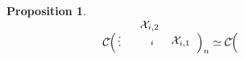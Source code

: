 \documentclass[10pt]{amsart}
\theoremstyle{break}
\newtheorem{pro}[de]{Proposition}
\begin{document}
\begin{pro}
\begin{eqnarray*}
{{\mathcal{C}}}\acute{}\Big( \ 
\unitlength 0.1in
\begin{picture}(9.0,2.500)(2.00,-4.500)
\special{pn 8}\special{pa 370 300}\special{pa 330 250}\special{fp}\special{pa 275 355}\special{pa 200 280}\special{fp}\special{pa 280 450}\special{pa 200 490}\special{fp}\special{pa 370 500}\special{pa 340 550}\special{fp}\put(2.000,-4.5000){\makebox(0,0){$\cdot$}}\put(1.9000,-4.000){\makebox(0,0){$\cdot$}}\put(2.000,-3.5000){\makebox(0,0){$\cdot$}}\put(9.5000,-4.000){\makebox(0,0){$\mathcal{X}_{{i,1}}$}}\put(5.660000,-2.0000){\makebox(0,0){$\mathcal{X}_{{i,2}}$}}\put(6.000,-4.1000){\makebox(0,0){${}_{i}$}}\special{pn 8}\special{ar 370 400 100 100  0.0000000 0.1200000}\special{ar 370 400 100 100  0.4800000 0.6000000}\special{ar 370 400 100 100  0.9600000 1.0800000}\special{ar 370 400 100 100  1.4400000 1.5600000}\special{ar 370 400 100 100  1.9200000 2.0400000}\special{ar 370 400 100 100  2.4000000 2.5200000}\special{ar 370 400 100 100  2.8800000 3.0000000}\special{ar 370 400 100 100  3.3600000 3.4800000}\special{ar 370 400 100 100  3.8400000 3.9600000}\special{ar 370 400 100 100  4.3200000 4.4400000}\special{ar 370 400 100 100  4.8000000 4.9200000}\special{ar 370 400 100 100  5.2800000 5.4000000}\special{ar 370 400 100 100  5.7600000 5.8800000}\special{ar 370 400 100 100  6.2400000 6.2832853}\special{pn 8}\special{pa 566 329}\special{pa 566 269}\special{fp}\special{pn 8}\special{pa 470 390}\special{pa 495 356}\special{pa 519 327}\special{pa 543 306}\special{pa 566 299}\special{pa 587 310}\special{pa 608 333}\special{pa 630 362}\special{pa 654 388}\special{pa 681 415}\special{pa 711 419}\special{pa 745 415}\special{pa 770 410}\special{sp}\special{pn 8}\special{pa 810 410}\special{pa 820 410}\special{fp}\special{sh 1}\special{pa 820 410}\special{pa 753 390}\special{pa 767 410}\special{pa 753 430}\special{pa 820 410}\special{fp}\end{picture}
 \ \Big)_{n} \simeq {{\mathcal{C}}}\acute{}\Big( \ 
\unitlength 0.1in
\begin{picture}(9.0,1.7500)(2.00,-4.500)

\end{picture}
\end{eqnarray*}
\end{pro}
\end{document}
